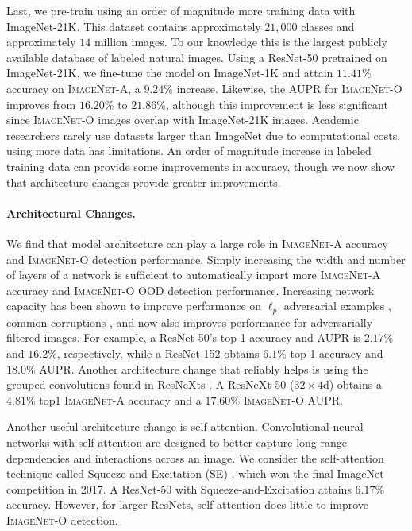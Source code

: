 \documentclass[10pt,twocolumn,letterpaper]{article}
\begin{document}
Last, we pre-train using an order of magnitude more training data with ImageNet-21K. This dataset contains approximately $21,000$ classes and approximately $14$ million images. To our knowledge this is the largest publicly available database of labeled natural images. Using a ResNet-50 pretrained on ImageNet-21K, we fine-tune the model on ImageNet-1K and attain $11.41\%$ accuracy on \textsc{ImageNet-A}, a $9.24\%$ increase. Likewise, the AUPR for \textsc{ImageNet-O} improves from $16.20\%$ to $21.86\%$, although this improvement is less significant since \textsc{ImageNet-O} images overlap with ImageNet-21K images. Academic researchers rarely use datasets larger than ImageNet due to computational costs, using more data has limitations. An order of magnitude increase in labeled training data can provide some improvements in accuracy, though we now show that architecture changes provide greater improvements.


\paragraph{Architectural Changes.}
We find that model architecture can play a large role in \textsc{ImageNet-A} accuracy and \textsc{ImageNet-O} detection performance.
Simply increasing the width and number of layers of a network is sufficient to automatically impart more \textsc{ImageNet-A} accuracy and \textsc{ImageNet-O} OOD detection performance. Increasing network capacity has been shown to improve performance on $\ell_p$ adversarial examples \cite{kurakin}, common corruptions \cite{hendrycks2019robustness}, and now also improves performance for adversarially filtered images. For example, a ResNet-50's top-1 accuracy and AUPR is $2.17\%$ and $16.2\%$, respectively, while a ResNet-152 obtains $6.1\%$ top-1 accuracy and $18.0\%$ AUPR. Another architecture change that reliably helps is using the grouped convolutions found in ResNeXts \cite{resnext}. A ResNeXt-50 ($32\times4$d) obtains a $4.81\%$ top1 \textsc{ImageNet-A} accuracy and a $17.60\%$ \textsc{ImageNet-O} AUPR.

Another useful architecture change is self-attention.
Convolutional neural networks with self-attention \cite{Hu2018GatherExciteE} are designed to better capture long-range dependencies and interactions across an image. We consider the self-attention technique called Squeeze-and-Excitation (SE) \cite{Hu2018SqueezeandExcitationN}, which won the final ImageNet competition in 2017. A ResNet-50 with Squeeze-and-Excitation attains $6.17\%$ accuracy. However, for larger ResNets, self-attention does little to improve \textsc{ImageNet-O} detection.
\end{document}
